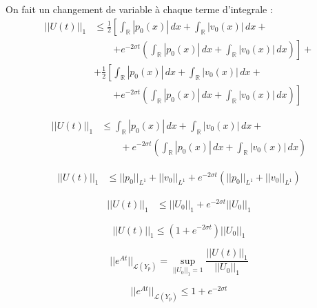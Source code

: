 \documentclass[a4paper,11pt]{article}
\begin{document}
On fait un changement de variable à chaque terme d'integrale :
\begin{equation*}
\begin{split}
    ||U(t)||_1 & \le \frac{1}{2} \left[\int_{\mathbb{R}}|p_0(x)| \,dx + \int_{\mathbb{R}} |v_0(x)| \,dx + \right. \\
   & \qquad \left. + e^{-2\sigma t} \left(\int_{\mathbb{R}} |p_0(x)| \,dx + \int_{\mathbb{R}} |v_0(x)| \,dx \right) \right] + \\
   & + \frac{1}{2} \left[ \int_{\mathbb{R}}|p_0(x)| \,dx + \int_{\mathbb{R}} |v_0(x)| \,dx + \right. \\
   & \qquad \left. + e^{-2\sigma t} \left(\int_{\mathbb{R}} |p_0(x)| \,dx + \int_{\mathbb{R}} |v_0(x)| \,dx \right) \right]
\end{split}
\end{equation*}

\begin{equation*}
\begin{split}
    ||U(t)||_1 & \le \int_{\mathbb{R}}|p_0(x)| \,dx + \int_{\mathbb{R}} |v_0(x)| \,dx + \\
   & \qquad + e^{-2\sigma t} \left( \int_{\mathbb{R}} |p_0(x)| \,dx + \int_{\mathbb{R}} |v_0(x)| \,dx \right)
\end{split}
\end{equation*}

\begin{equation*}
\begin{split}
    ||U(t)||_1 & \le ||p_0||_{L^{1}} + ||v_0||_{L^{1}} 
    + e^{-2\sigma t} \left(||p_0||_{L^{1}} + ||v_0||_{L^{1}} \right)
\end{split}
\end{equation*}

\begin{equation*}
\begin{split}
    ||U(t)||_1 & \le ||U_0||_{1} 
    + e^{-2\sigma t} ||U_0||_{1}
\end{split}
\end{equation*}

\begin{equation}
    ||U(t)||_1 \le \left( 1 + e^{-2\sigma t} \right) ||U_0||_{1}
\end{equation}

\begin{equation*}
||e^{At}||_{\mathcal{L}(Y_p)} = \sup_{||U_{0}||_1 = 1}\frac{||U(t)||_1}{||U_{0}||_1}
\end{equation*}

\begin{equation*}
    ||e^{At}||_{\mathcal{L}(Y_p)} \le 1 + e^{-2\sigma t}
\end{equation*}
\end{document}
